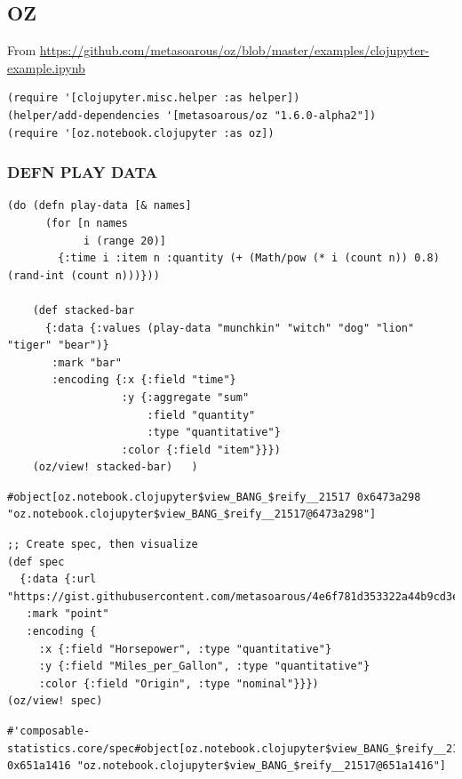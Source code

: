 \documentclass[10pt,oneside,x11names]{article}
\begin{document}
\subsection{OZ}
\label{sec:org2b98fdc}

From
\url{https://github.com/metasoarous/oz/blob/master/examples/clojupyter-example.ipynb}

\begin{verbatim}
(require '[clojupyter.misc.helper :as helper])
(helper/add-dependencies '[metasoarous/oz "1.6.0-alpha2"])
(require '[oz.notebook.clojupyter :as oz])
\end{verbatim}

\subsubsection{DEFN PLAY DATA}
\label{sec:orgc3eddeb}

\begin{verbatim}
(do (defn play-data [& names]
      (for [n names
            i (range 20)]
        {:time i :item n :quantity (+ (Math/pow (* i (count n)) 0.8) (rand-int (count n)))}))

    (def stacked-bar
      {:data {:values (play-data "munchkin" "witch" "dog" "lion" "tiger" "bear")}
       :mark "bar"
       :encoding {:x {:field "time"}
                  :y {:aggregate "sum"
                      :field "quantity"
                      :type "quantitative"}
                  :color {:field "item"}}})
    (oz/view! stacked-bar)   )
\end{verbatim}

\begin{verbatim}
#object[oz.notebook.clojupyter$view_BANG_$reify__21517 0x6473a298 "oz.notebook.clojupyter$view_BANG_$reify__21517@6473a298"]
\end{verbatim}


\begin{verbatim}
;; Create spec, then visualize
(def spec
  {:data {:url "https://gist.githubusercontent.com/metasoarous/4e6f781d353322a44b9cd3e4597c532c/raw/cd633d9bb8e0bed4a5b8e66a32b9569ca2147989/cars.json"}
   :mark "point"
   :encoding {
     :x {:field "Horsepower", :type "quantitative"}
     :y {:field "Miles_per_Gallon", :type "quantitative"}
     :color {:field "Origin", :type "nominal"}}})
(oz/view! spec)
\end{verbatim}

\begin{verbatim}
#'composable-statistics.core/spec#object[oz.notebook.clojupyter$view_BANG_$reify__21517 0x651a1416 "oz.notebook.clojupyter$view_BANG_$reify__21517@651a1416"]
\end{verbatim}
\end{document}
